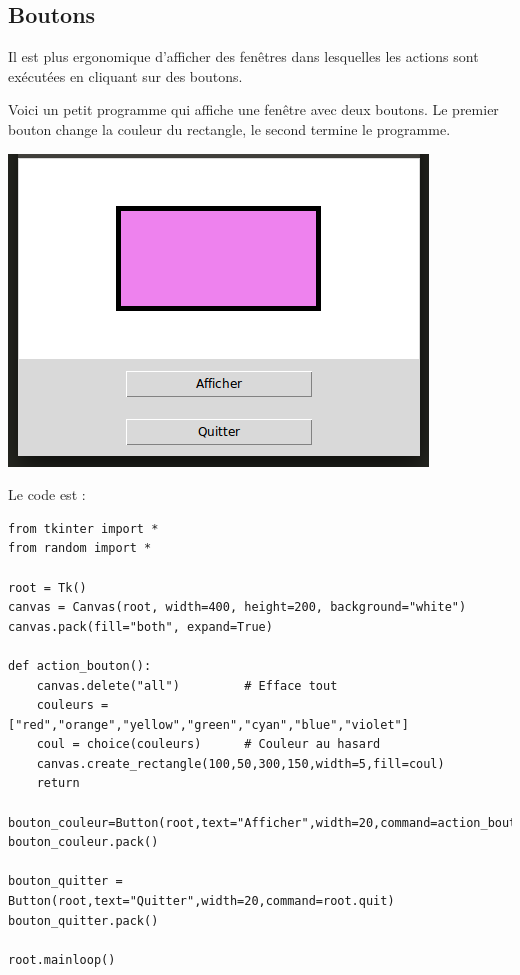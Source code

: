 \documentclass[11pt,class=report,crop=false]{standalone}
\begin{document}
\subsection{Boutons}

Il est plus ergonomique d'afficher des fenêtres dans lesquelles les actions sont exécutées en cliquant sur des boutons.

Voici un petit programme qui affiche une fenêtre avec deux boutons. Le premier bouton change la couleur du rectangle, le second termine le programme.
\begin{center}
\includegraphics[scale=\myscale,scale=0.6]{../statistique/ecran-stat-cours-boutons}
\end{center}
Le code est :
\begin{lstlisting}
from tkinter import *
from random import *

root = Tk()     
canvas = Canvas(root, width=400, height=200, background="white")
canvas.pack(fill="both", expand=True)

def action_bouton():
    canvas.delete("all")         # Efface tout
    couleurs = ["red","orange","yellow","green","cyan","blue","violet"]
    coul = choice(couleurs)      # Couleur au hasard
    canvas.create_rectangle(100,50,300,150,width=5,fill=coul)
    return

bouton_couleur=Button(root,text="Afficher",width=20,command=action_bouton)
bouton_couleur.pack()

bouton_quitter = Button(root,text="Quitter",width=20,command=root.quit)
bouton_quitter.pack()

root.mainloop()
\end{lstlisting}
\end{document}
